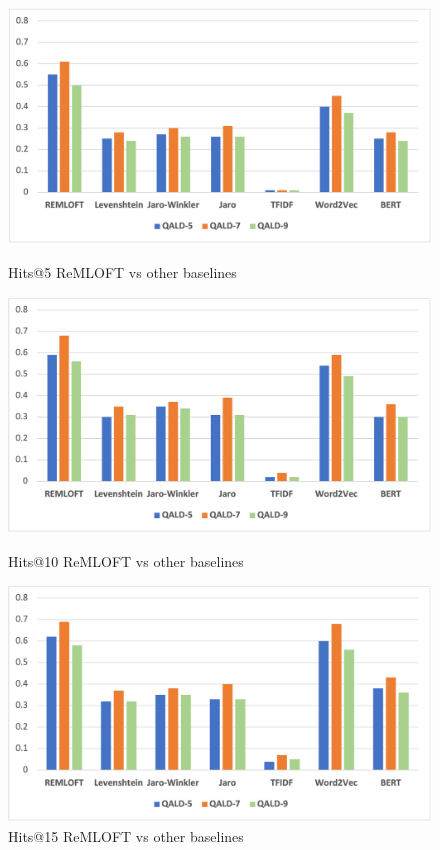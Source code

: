 \begin{figure}[p]
    \centering
    \begin{minipage}{0.7\textwidth}
   \includegraphics[width=\textwidth]{chapters/figures/top5bert.png}
    \caption{Hits@5 ReMLOFT vs other baselines}
    \label{fig:top5hits}
     \end{minipage}
         \begin{minipage}{0.7\textwidth}
   \includegraphics[width=\textwidth]{chapters/figures/top10bert.png}
    \caption{Hits@10 ReMLOFT vs other baselines}
    \label{fig:top10hits}
     \end{minipage}
         \begin{minipage}{0.7\textwidth}
    \includegraphics[width=\textwidth]{chapters/figures/Top15Bert.png}
        \caption{Hits@15 ReMLOFT vs other baselines}
        \label{fig:top15hits}
    \end{minipage}
\end{figure}


